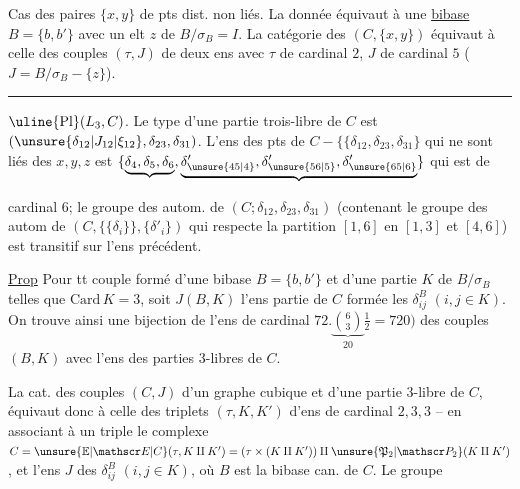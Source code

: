 Cas des paires $\{x,y\}$ de pts dist. non liés. La donnée équivaut à une \uline{bibase} $B=\{b,b'\}$ avec un elt $z$ de $B/\sigma_B=I$. La catégorie des $(C,\{x,y\})$ équivaut à celle des couples $(\tau,J)$ de deux ens avec $\tau$ de cardinal $2$,  $J$ de cardinal $5$ ($J=B/\sigma_B-\{z\}$).
\noindent\rule{2.3cm}{.4pt}

$\uline{\mathrm{Pl}}(L_3,C)$. Le type d'une partie  trois-libre  de $C$ est $(\unsure{\delta_{12}|J_{12}|\xi_{12}},\delta_{23},\delta_{31})$. L'ens des pts de $C-\{\{\delta_{12},\delta_{23},\delta_{31}\}$ qui ne sont  liés   des $x,y,z$ est $\{\underbrace{\delta_4,\delta_5,\delta_6},\underbrace{\delta'_{\unsure{45|4}},\delta'_{\unsure{56|5}},\delta'_{\unsure{65|6}}}\}$ qui est de

cardinal $6$; le groupe des autom. de $(C;\delta_{12},\delta_{23},\delta_{31})$ (contenant le groupe des autom de $(C,\{\{\delta_i\}\},\{\delta'_i\})$ qui respecte la partition  $[1,6]$ en $[1,3]$ et $[4,6]$) est transitif sur l'ens précédent.

\uline{Prop} Pour tt couple  formé d'une bibase $B=\{b,b'\}$  et d'une partie $K$ de $B/\sigma_B$ telles que $\mathrm{Card}\,K=3$, soit $J(B,K)$ l'ens partie de $C$ formée les $\delta^B_{ij}$ $(i,j\in K)$. On trouve ainsi une bijection de l'ens  de cardinal $72.\underbrace{\binom{6}{3}}_{20}\frac{1}{2}=720)$ des couples $(B,K)$ avec l'ens des parties $3$-libres de $C$.

La cat. des couples $(C,J)$ d'un graphe cubique et d'une partie $3$-libre de $C$, équivaut donc à celle des triplets $(\tau,K,K')$ d'ens  de cardinal $2,3,3$ -- en associant à un triple le complexe $C=\unsure{\mathbb E|\mathscr E|C}(\tau,K\amalg K')=(\tau\times(K\amalg K'))\amalg\unsure{\mathfrak P_2|\mathscr P_2}(K\amalg K')$, et l'ens $J$ des $\delta^B_{ij}$ $(i,j\in K)$, où $B$ est la bibase can. de $C$. Le groupe
